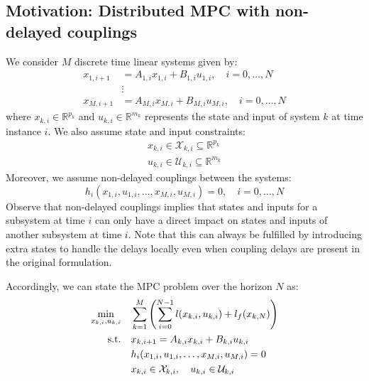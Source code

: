 \subsection{Motivation: Distributed MPC with non-delayed couplings}
We consider $M$ discrete time linear systems given by:
\begin{subequations}
\begin{align}
x_{1,i+1} & = A_{1,i} x_{1,i} + B_{1,i} u_{1,i}, \quad i = 0,\dots,N \\
& \vdots \\
x_{M,i+1} & = A_{M,i} x_{M,i} + B_{M,i} u_{M,i}, \quad i = 0,\dots,N 
\end{align}
\end{subequations}
where $x_{k,i} \in \mathbb{R}^{p_{k}}$ and $u_{k,i} \in \mathbb{R}^{m_{k}}$ represents the state and input of system $k$ at time instance $i$. We also assume state and input constraints:
\begin{subequations}
\begin{align}
x_{k,i} \in \mathcal{X}_{k,i} \subseteq \mathbb{R}^{p_{k}} \\
u_{k,i} \in \mathcal{U}_{k,i} \subseteq \mathbb{R}^{m_{k}}
\end{align}
\end{subequations}
Moreover, we assume non-delayed couplings between the systems:
\begin{equation}
h_i(x_{1,i}, u_{1,i}, \dots, x_{M,i}, u_{M,i}) = 0, \quad i = 0,\dots,N
\end{equation}
Observe that non-delayed couplings implies that states and inputs for a subsystem at time $i$ can only have a direct impact on states and inputs of another subsystem at time $i$. Note that this can always be fulfilled by introducing extra states to handle the delays locally even when coupling delays are present in the original formulation.

Accordingly, we can state the MPC problem over the horizon $N$ as:
\begin{subequations}
\begin{align}
\min_{x_{k,i}, u_{k,i}} & \quad \sum_{k=1}^{M} \left( \sum_{i=0}^{N-1} \mathnormal{l}(x_{k,i}, u_{k,i}) + \mathnormal{l}_f(x_{k,N}) \right) \label{e:MPCobjective} \\
\text{s.t.} & \quad x_{k,i+1} = A_{k,i}x_{k,i} + B_{k,i}u_{k,i} \\
& \quad h_i(x_{1,i}, u_{1,i}, \dots, x_{M,i}, u_{M,i}) = 0 \label{e:MPCcouplings} \\
& \quad x_{k,i} \in \mathcal{X}_{k,i}, \quad u_{k,i} \in \mathcal{U}_{k,i} \label{e:MPCconstrains}
\end{align}
\end{subequations}

